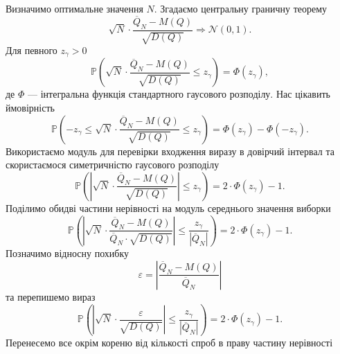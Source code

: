 Визначимо оптимальне значення $N$.
Згадаємо центральну граничну теорему
\begin{equation*}
  \sqrt{N}
    \cdot \frac{\overline{Q}_N - M\left( Q \right)}
    {\sqrt{D\left( Q \right)}} \Rightarrow \mathcal{N}\left( 0, 1 \right).
\end{equation*}
Для певного $z_{\gamma} > 0$
\begin{equation*}
  \mathbb{P}\left(
    \sqrt{N}
    \cdot \frac{\overline{Q}_N - M\left( Q \right)}{\sqrt{D\left( Q \right)}}
    \le z_{\gamma}
  \right) = \Phi\left( z_{\gamma} \right),
\end{equation*}
де $\Phi$ --- інтегральна функція стандартного гаусового розподілу.
Нас цікавить ймовірність
\begin{equation*}
  \mathbb{P}\left(
    -z_{\gamma} \le
    \sqrt{N}
    \cdot \frac{\overline{Q}_N - M\left( Q \right)}{\sqrt{D\left( Q \right)}}
    \le z_{\gamma}
  \right)
  = \Phi\left( z_{\gamma} \right) - \Phi\left( -z_{\gamma} \right).
\end{equation*}
Використаємо модуль для перевірки входження виразу в довірчий інтервал
та скористаємося симетричністю гаусового розподілу
\begin{equation*}
  \mathbb{P}\left(
    \left|
      \sqrt{N}
      \cdot \frac{\overline{Q}_N - M\left( Q \right)}{\sqrt{D\left( Q \right)}}
    \right|
    \le z_{\gamma}
  \right)
  = 2 \cdot \Phi\left( z_{\gamma} \right) - 1.
\end{equation*}
Поділимо обидві частини нерівності на модуль середнього значення виборки
\begin{equation*}
  \mathbb{P}\left(
    \left|
      \sqrt{N}
      \cdot \frac{\overline{Q}_N - M\left( Q \right)}
        {\overline{Q}_N \cdot \sqrt{D\left( Q \right)}}
    \right|
    \le \frac{z_{\gamma}}{\left| \overline{Q}_N \right|}
  \right)
  = 2 \cdot \Phi\left( z_{\gamma} \right) - 1.
\end{equation*}
Позначимо відносну похибку
\begin{equation*}
  \varepsilon
  = \left| \frac{\overline{Q}_N - M\left( Q \right)}{\overline{Q}_N} \right|
\end{equation*}
та перепишемо вираз
\begin{equation*}
  \mathbb{P}\left(
    \left|
      \sqrt{N}
      \cdot \frac{\varepsilon}
        {\sqrt{D\left( Q \right)}}
    \right|
    \le \frac{z_{\gamma}}{\left| \overline{Q}_N \right|}
  \right)
  = 2 \cdot \Phi\left( z_{\gamma} \right) - 1.
\end{equation*}
Перенесемо все окрім кореню від кількості спроб в праву частину нерівності
